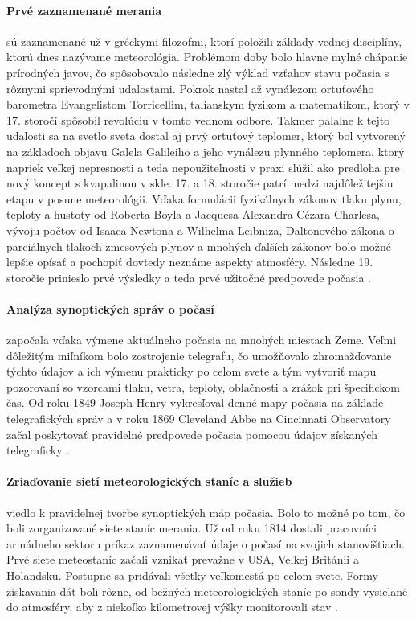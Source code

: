 \paragraph{Prvé zaznamenané merania} sú zaznamenané už v gréckymi filozofmi, ktorí položili základy vednej disciplíny, ktorú dnes nazývame meteorológia. Problémom doby bolo hlavne mylné chápanie prírodných javov, čo spôsobovalo následne zlý výklad vzťahov stavu počasia s rôznymi sprievodnými udalosťami. Pokrok nastal až vynálezom ortuťového barometra Evangelistom Torricellim, talianskym fyzikom a matematikom, ktorý v 17. storočí spôsobil revolúciu v tomto vednom odbore. Takmer palalne k tejto udalosti sa na svetlo sveta dostal aj prvý ortuťový teplomer, ktorý bol vytvorený na základoch objavu Galela Galileiho a jeho vynálezu plynného teplomera, ktorý napriek veľkej nepresnosti a teda nepoužiteľnosti v praxi slúžil ako predloha pre nový koncept s kvapalinou v skle.
17. a 18. storočie patrí medzi najdôležitejšiu etapu v posune meteorológii. Vďaka formulácii fyzikálnych zákonov tlaku plynu, teploty a hustoty od Roberta Boyla a Jacquesa Alexandra Cézara Charlesa, vývoju počtov od Isaaca Newtona a Wilhelma Leibniza, Daltonového zákona o parciálnych tlakoch zmesových plynov a mnohých ďalších zákonov bolo možné lepšie opísať a pochopiť dovtedy neznáme aspekty atmosféry. Následne 19. storočie prinieslo prvé výsledky a teda prvé užitočné predpovede počasia \cite{meteo}.

\paragraph{Analýza synoptických správ o počasí} započala vďaka výmene aktuálneho počasia na mnohých miestach Zeme. Veľmi dôležitým miľníkom bolo zostrojenie telegrafu, čo umožňovalo zhromažďovanie týchto údajov a ich výmenu prakticky po celom svete a tým vytvoriť mapu pozorovaní so vzorcami tlaku, vetra, teploty, oblačnosti a zrážok pri špecifickom čas. Od roku 1849 Joseph Henry vykresľoval denné mapy počasia na základe telegrafických správ a v roku 1869 Cleveland Abbe na Cincinnati Observatory začal poskytovať pravidelné predpovede počasia pomocou údajov získaných telegraficky \cite{meteo}.

\paragraph{Zriaďovanie sietí meteorologických staníc a služieb} viedlo k pravidelnej tvorbe synoptických máp počasia. Bolo to možné po tom, čo boli zorganizované siete staníc merania. Už od roku 1814 dostali pracovníci armádneho sektoru príkaz zaznamenávať údaje o počasí na svojich stanovištiach. Prvé siete meteostaníc začali vznikať prevažne v USA, Veľkej Británii a Holandsku. Postupne sa pridávali všetky veľkomestá po celom svete. Formy získavania dát boli rôzne, od bežných meteorologických staníc po sondy vysielané do atmosféry, aby z niekoľko kilometrovej výšky monitorovali stav \cite{meteo}. 

